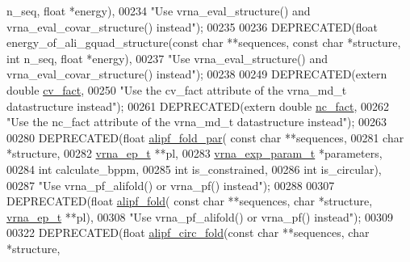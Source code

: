 \begin{DoxyCode}
      n\_seq, \textcolor{keywordtype}{float} *energy),
00234            \textcolor{stringliteral}{"Use vrna\_eval\_structure() and vrna\_eval\_covar\_structure() instead"});
00235 
00236 DEPRECATED(\textcolor{keywordtype}{float} energy\_of\_ali\_gquad\_structure(\textcolor{keyword}{const} \textcolor{keywordtype}{char} **sequences, \textcolor{keyword}{const} \textcolor{keywordtype}{char} *structure, \textcolor{keywordtype}{int} n\_seq, \textcolor{keywordtype}{
      float} *energy),
00237           \textcolor{stringliteral}{"Use vrna\_eval\_structure() and vrna\_eval\_covar\_structure() instead"});
00238 
00249 DEPRECATED(\textcolor{keyword}{extern}  \textcolor{keywordtype}{double}  \hyperlink{group__consensus__fold_gaf3cbac6ff5d706d6e414677841ddf94c}{cv\_fact},
00250           \textcolor{stringliteral}{"Use the cv\_fact attribute of the vrna\_md\_t datastructure instead"});
00261 DEPRECATED(\textcolor{keyword}{extern}  \textcolor{keywordtype}{double}  \hyperlink{group__consensus__fold_ga502948a122a2af5b914355b1f3ea2f61}{nc\_fact},
00262           \textcolor{stringliteral}{"Use the nc\_fact attribute of the vrna\_md\_t datastructure instead"});
00263 
00280 DEPRECATED(\textcolor{keywordtype}{float} \hyperlink{group__consensus__pf__fold_gab46954fb0ed3b6d5631e7f9b802978cd}{alipf\_fold\_par}( \textcolor{keyword}{const} \textcolor{keywordtype}{char} **sequences,
00281                       \textcolor{keywordtype}{char} *structure,
00282                       \hyperlink{group__struct__utils_structvrna__elem__prob__s}{vrna\_ep\_t} **pl,
00283                       \hyperlink{group__energy__parameters_structvrna__exp__param__s}{vrna\_exp\_param\_t} *parameters,
00284                       \textcolor{keywordtype}{int} calculate\_bppm,
00285                       \textcolor{keywordtype}{int} is\_constrained,
00286                       \textcolor{keywordtype}{int} is\_circular),
00287           \textcolor{stringliteral}{"Use vrna\_pf\_alifold() or vrna\_pf() instead"});
00288 
00307 DEPRECATED(\textcolor{keywordtype}{float} \hyperlink{group__consensus__pf__fold_ga1a5f6cfb9d761fa862ce4edc7c369cd2}{alipf\_fold}( \textcolor{keyword}{const} \textcolor{keywordtype}{char} **sequences, \textcolor{keywordtype}{char} *structure, 
      \hyperlink{group__struct__utils_structvrna__elem__prob__s}{vrna\_ep\_t} **pl),
00308           \textcolor{stringliteral}{"Use vrna\_pf\_alifold() or vrna\_pf() instead"});
00309 
00322 DEPRECATED(\textcolor{keywordtype}{float} \hyperlink{group__consensus__pf__fold_ga604a42ad64178279551ad3e4def3d603}{alipf\_circ\_fold}(\textcolor{keyword}{const} \textcolor{keywordtype}{char} **sequences, \textcolor{keywordtype}{char} *structure, 

\end{DoxyCode}
